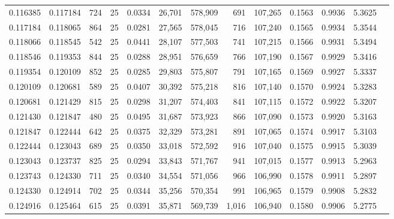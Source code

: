 \begin{tabular}{rrrrrrrrrrrrr}
0.116385 & 0.117184 &   724 &  25 &                                     0.0334 &  26,701 & 578,909 &     691 & 107,265 & 0.1563 & 0.9936 & 5.3625 \\
0.117184 & 0.118065 &   864 &  25 &                                     0.0281 &  27,565 & 578,045 &     716 & 107,240 & 0.1565 & 0.9934 & 5.3544 \\
0.118066 & 0.118545 &   542 &  25 &                                     0.0441 &  28,107 & 577,503 &     741 & 107,215 & 0.1566 & 0.9931 & 5.3494 \\
0.118546 & 0.119353 &   844 &  25 &                                     0.0288 &  28,951 & 576,659 &     766 & 107,190 & 0.1567 & 0.9929 & 5.3416 \\
0.119354 & 0.120109 &   852 &  25 &                                     0.0285 &  29,803 & 575,807 &     791 & 107,165 & 0.1569 & 0.9927 & 5.3337 \\
0.120109 & 0.120681 &   589 &  25 &                                     0.0407 &  30,392 & 575,218 &     816 & 107,140 & 0.1570 & 0.9924 & 5.3283 \\
0.120681 & 0.121429 &   815 &  25 &                                     0.0298 &  31,207 & 574,403 &     841 & 107,115 & 0.1572 & 0.9922 & 5.3207 \\
0.121430 & 0.121847 &   480 &  25 &                                     0.0495 &  31,687 & 573,923 &     866 & 107,090 & 0.1573 & 0.9920 & 5.3163 \\
0.121847 & 0.122444 &   642 &  25 &                                     0.0375 &  32,329 & 573,281 &     891 & 107,065 & 0.1574 & 0.9917 & 5.3103 \\
0.122444 & 0.123043 &   689 &  25 &                                     0.0350 &  33,018 & 572,592 &     916 & 107,040 & 0.1575 & 0.9915 & 5.3039 \\
0.123043 & 0.123737 &   825 &  25 &                                     0.0294 &  33,843 & 571,767 &     941 & 107,015 & 0.1577 & 0.9913 & 5.2963 \\
0.123743 & 0.124330 &   711 &  25 &                                     0.0340 &  34,554 & 571,056 &     966 & 106,990 & 0.1578 & 0.9911 & 5.2897 \\
0.124330 & 0.124914 &   702 &  25 &                                     0.0344 &  35,256 & 570,354 &     991 & 106,965 & 0.1579 & 0.9908 & 5.2832 \\
0.124916 & 0.125464 &   615 &  25 &                                     0.0391 &  35,871 & 569,739 &   1,016 & 106,940 & 0.1580 & 0.9906 & 5.2775 \\

\end{tabular}
